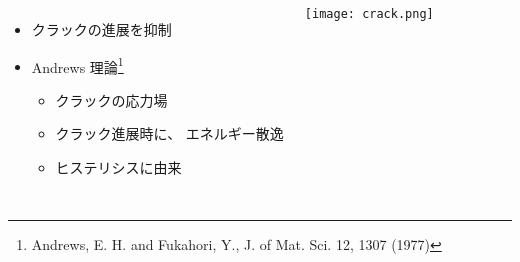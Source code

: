 \begin{columns}[totalwidth=.9\textwidth]
        \begin{itemize}
            \item クラックの進展を\alert{抑制}
            \item Andrews 理論\footnote{
                \small{Andrews, E. H. and Fukahori, Y., J. of Mat. Sci. 12, 1307 (1977)}
            }
                \begin{itemize}
                    \item クラックの応力場
                    \item クラック進展時に、{\color{red} エネルギー散逸}
                    \item \alert{ヒステリシスに由来}
                \end{itemize}	
        \end{itemize}
        \texttt{[image: crack.png]}     
\end{columns}
